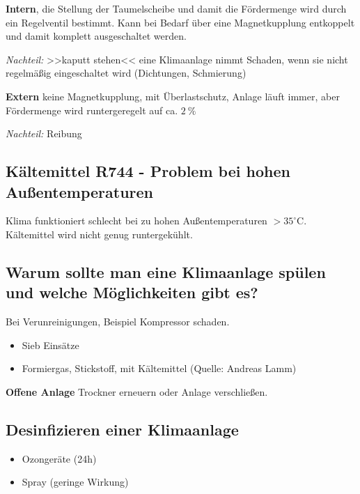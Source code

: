 \textbf{Intern}, die Stellung der Taumelscheibe und damit die
Fördermenge wird durch ein Regelventil bestimmt. Kann bei Bedarf über
eine Magnetkupplung entkoppelt und damit komplett ausgeschaltet werden.

\emph{Nachteil:} >>kaputt stehen<< eine Klimaanlage nimmt Schaden, wenn
sie nicht regelmäßig eingeschaltet wird (Dichtungen, Schmierung)

\textbf{Extern} keine Magnetkupplung, mit Überlastschutz, Anlage läuft
immer, aber Fördermenge wird runtergeregelt auf ca. $2~\%$

\emph{Nachteil:} Reibung

\subsection{Kältemittel R744 - Problem bei hohen
Außentemperaturen}\label{kaeltemittel-r744-problem-bei-hohen-aussentemperaturen}

Klima funktioniert schlecht bei zu hohen Außentemperaturen
$> 35^\circ\text{C}$. Kältemittel wird nicht genug runtergekühlt.

\subsection{Warum sollte man eine Klimaanlage spülen und welche
Möglichkeiten gibt
es?}\label{warum-sollte-man-eine-klimaanlage-spuelen-und-welche-moeglichkeiten-gibt-es}

Bei Verunreinigungen, Beispiel Kompressor schaden.

\begin{itemize}
\item
  Sieb Einsätze
\item
  Formiergas, Stickstoff, mit Kältemittel (Quelle: Andreas Lamm)
\end{itemize}

\textbf{Offene Anlage} Trockner erneuern oder Anlage verschließen.

\subsection{Desinfizieren einer
Klimaanlage}\label{desinfizieren-einer-klimaanlage}

\begin{itemize}
\item
  Ozongeräte (24h)
\item
  Spray (geringe Wirkung)
\end{itemize}

